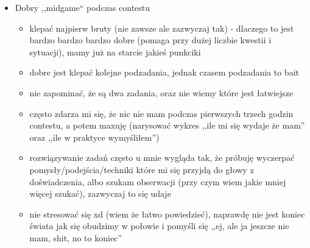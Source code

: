 \documentclass{article}
\begin{document}
\begin{itemize}
    \item Dobry ,,midgame`` podczas contestu
    \begin{itemize}
        \item klepać najpierw bruty (nie zawsze ale zazwyczaj tak) - dlaczego to jest bardzo bardzo bardzo dobre (pomaga przy dużej liczbie kwestii i sytuacji), mamy już na starcie jakieś punkciki
        \item dobre jest klepać kolejne podzadania, jednak czasem podzadania to bait
        \item nie zapominać, że są dwa zadania, oraz nie wiemy które jest łatwiejsze
        \item często zdarza mi się, że nic nie mam podczas pierwszych trzech godzin contestu, a potem maxuję (narysować wykres ,,ile mi się wydaje że mam'' oraz ,,ile w praktyce wymyśliłem'')
        \item rozwiązywanie zadań często u mnie wygląda tak, że próbuję wyczerpać pomysły/podejścia/techniki które mi się przyjdą do głowy z doświadczenia, albo szukam obserwacji (przy czym wiem jakie mniej więcej szukać), zazwyczaj to się udaje
        \item nie stresować się xd (wiem że łatwo powiedzieć), naprawdę nie jest koniec świata jak się obudzimy w połowie i pomyśli się ,,ej, ale ja jeszcze nie mam, shit, no to koniec''
    \end{itemize}
    

\end{itemize}
\end{document}
